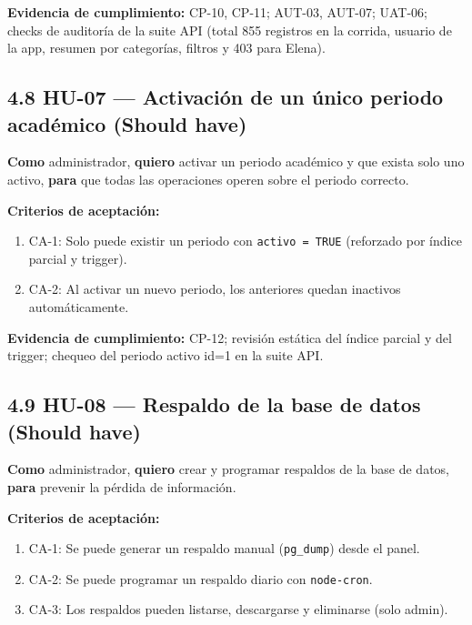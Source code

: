 \documentclass[11pt,a4paper]{article}
\begin{document}
\textbf{Evidencia de cumplimiento:} CP-10, CP-11; AUT-03, AUT-07; UAT-06; checks de auditoría de la suite API (total 855 registros en la corrida, usuario de la app, resumen por categorías, filtros y 403 para Elena).


\subsection*{4.8 HU-07 --- Activación de un único periodo académico \textbf{(Should have)}}


\textbf{Como} administrador, \textbf{quiero} activar un periodo académico y que exista solo uno activo, \textbf{para} que todas las operaciones operen sobre el periodo correcto.


\textbf{Criterios de aceptación:}


\begin{enumerate}[leftmargin=*]
\item CA-1: Solo puede existir un periodo con \texttt{activo = TRUE} (reforzado por índice parcial y trigger).
\item CA-2: Al activar un nuevo periodo, los anteriores quedan inactivos automáticamente.
\end{enumerate}


\textbf{Evidencia de cumplimiento:} CP-12; revisión estática del índice parcial y del trigger; chequeo del periodo activo id=1 en la suite API.


\subsection*{4.9 HU-08 --- Respaldo de la base de datos \textbf{(Should have)}}


\textbf{Como} administrador, \textbf{quiero} crear y programar respaldos de la base de datos, \textbf{para} prevenir la pérdida de información.


\textbf{Criterios de aceptación:}


\begin{enumerate}[leftmargin=*]
\item CA-1: Se puede generar un respaldo manual (\texttt{pg\_dump}) desde el panel.
\item CA-2: Se puede programar un respaldo diario con \texttt{node-cron}.
\item CA-3: Los respaldos pueden listarse, descargarse y eliminarse (solo admin).
\end{enumerate}
\end{document}
